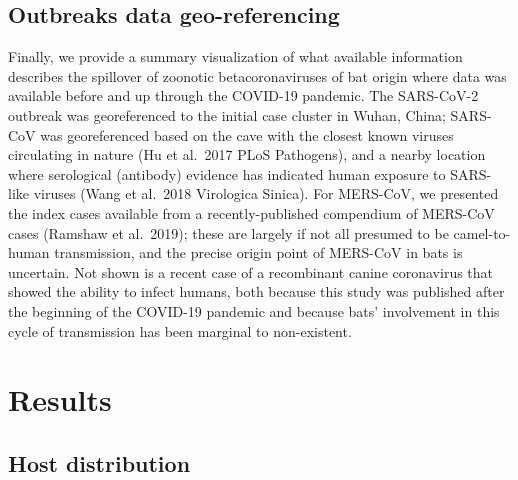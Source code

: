 \documentclass[10pt,oneside]{article}
\begin{document}
\hypertarget{outbreaks-data-geo-referencing}{%
\subsection{Outbreaks data
geo-referencing}\label{outbreaks-data-geo-referencing}}

Finally, we provide a summary visualization of what available
information describes the spillover of zoonotic betacoronaviruses of bat
origin where data was available before and up through the COVID-19
pandemic. The SARS-CoV-2 outbreak was georeferenced to the initial case
cluster in Wuhan, China; SARS-CoV was georeferenced based on the cave
with the closest known viruses circulating in nature (Hu et al.~2017
PLoS Pathogens), and a nearby location where serological (antibody)
evidence has indicated human exposure to SARS-like viruses (Wang et
al.~2018 Virologica Sinica). For MERS-CoV, we presented the index cases
available from a recently-published compendium of MERS-CoV cases
(Ramshaw et al.~2019); these are largely if not all presumed to be
camel-to-human transmission, and the precise origin point of MERS-CoV in
bats is uncertain. Not shown is a recent case of a recombinant canine
coronavirus that showed the ability to infect humans, both because this
study was published after the beginning of the COVID-19 pandemic and
because bats' involvement in this cycle of transmission has been
marginal to non-existent.

\hypertarget{results}{%
\section{Results}\label{results}}

\hypertarget{host-distribution}{%
\subsection{Host distribution}\label{host-distribution}}
\end{document}
